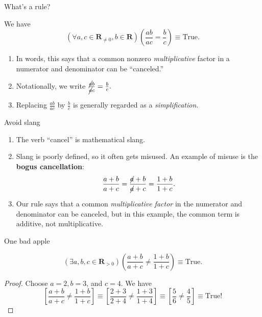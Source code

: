 \documentclass[portrait,fleqn,12pt]{beamer}
\newcommand{\reals}{\mathbf{R}}
\newenvironment{handlist}
   {\begin{enumerate}[\faHandPointRight]
       \addtolength{\itemsep}{0.0\itemsep}}
     {\end{enumerate}}
\begin{document}
\begin{frame}{What's a  rule?}

\begin{theorem} We have 
\begin{equation*} 
   \left(\forall a, c\in \reals_{\neq 0}, b \in \reals \right)\left(\frac{a b}{a c} = \frac{b}{c} \right) \equiv \text{True}.
  \end{equation*}
\end{theorem}

\begin{handlist}
\item In words, this says that a common nonzero \emph{multiplicative} factor in a numerator and denominator can be ``canceled.''
\item Notationally, we write 
$
\frac{\cancel{a} b}{ \cancel{a} c}  = \frac{b}{c}.
$
\item Replacing $\frac{a b}{a c}$ by $\frac{b}{c}$ is generally regarded as a \emph{simplification.}

\end{handlist}

\end{frame}

\begin{frame}{Avoid slang}

\begin{handlist}

\item The verb ``cancel''  is mathematical slang.  
\item Slang is poorly defined, so it  often gets misused. An example of misuse is the \textbf{bogus cancellation}:
\begin{equation*}
   \frac{a+b}{a+c} =  \frac{\cancel{a}+b}{\cancel{a} +c} = \frac{1 + b}{1 + c}.
\end{equation*}
\item Our rule says that a common \emph{multiplicative factor} in the numerator and denominator can be canceled, but in this example, the common term is additive, not multiplicative.
\end{handlist}

\end{frame}

\begin{frame}{One bad apple}
\begin{theorem}
  \begin{equation*}
    \left(\exists a,b,c \in \reals_{>0}\right)
       \left(\frac{a+b}{a+c} \neq \frac{1 + b}{1 + c} \right) \equiv \mbox{True}.
 \end{equation*}
\end{theorem}
\begin{proof} Choose $a=2,b=3$, and $c=4$. We have
  \begin{equation*}
    \left[\frac{a+b}{a+c} \neq \frac{1 + b}{1 + c} \right] \equiv
    \left[\frac{2+3}{2+4} \neq \frac{1 + 3}{1 + 4} \right]  \equiv
    \left [\frac{5}{6} \neq \frac{4}{5} \right]  \equiv \mbox{True!}
  \end{equation*}
\end{proof}
\end{frame}
\end{document}
